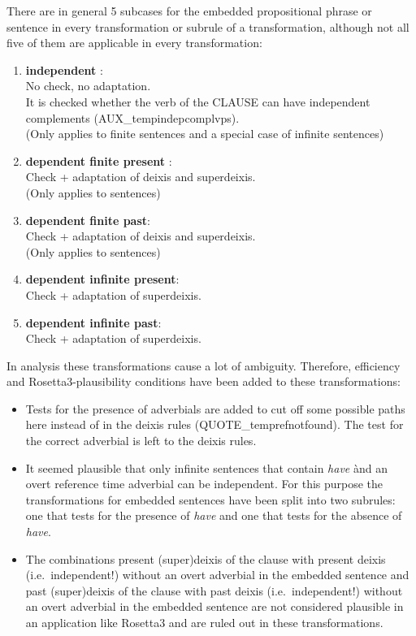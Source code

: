 \begin{description}
There are in general 5 subcases for the embedded propositional phrase or 
sentence in every transformation or subrule of a 
transformation, although not all five of them are applicable in every 
transformation:

\begin{enumerate}
\item {\bf independent }:\\
No check, no adaptation.\\
It is checked whether the verb of the CLAUSE can have independent complements
(AUX\_tempindepcomplvps).\\
(Only applies to finite sentences and a special case of infinite sentences)
\item {\bf dependent finite present }:\\
Check + adaptation of deixis and superdeixis.\\
(Only applies to sentences)
\item {\bf dependent finite past}:\\
Check + adaptation of deixis and superdeixis.\\
(Only applies to sentences)
\item {\bf dependent infinite present}:\\
Check + adaptation of superdeixis.
\item {\bf dependent infinite past}:\\
Check + adaptation of superdeixis.
\end{enumerate}

In analysis these transformations cause a lot of ambiguity. Therefore, 
efficiency and Rosetta3-plausibility conditions have been added to these 
transformations:
\begin{itemize}
\item Tests for the presence of adverbials are added to cut off some possible 
paths here instead of in the deixis rules 
(QUOTE\_temprefnotfound). The test for the correct adverbial is 
left to the deixis rules. 
\item It seemed plausible that only infinite sentences that contain {\em have}
 \`{a}nd an overt reference time adverbial can be independent.
For this purpose the transformations for embedded sentences 
have been split into two subrules: one that tests for the presence of {\em 
have} and one that tests for the absence of {\em have}.
\item The combinations present (super)deixis of the clause with present deixis 
(i.e.\ independent!) without an overt adverbial in the embedded sentence and 
past 
(super)deixis of the clause with past deixis (i.e.\ independent!) without an 
overt adverbial in the embedded sentence are not considered plausible in an 
application like Rosetta3 and are ruled out in these transformations.
\end{itemize}


\end{description}
